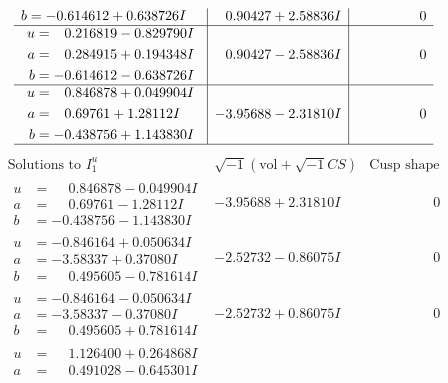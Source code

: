 \documentclass[1p]{elsarticle_modified}
\theoremstyle{definition}
\newcommand{\I}{\sqrt{-1}}
\begin{document}
$$\begin{array}{c|c|c}
\begin{aligned}
b &= -0.614612 + 0.638726 I\end{aligned}
 & \phantom{-}0.90427 + 2.58836 I & \phantom{-0.000000 } 0 \\ \hline\begin{aligned}
u &= \phantom{-}0.216819 - 0.829790 I \\
a &= \phantom{-}0.284915 + 0.194348 I \\
b &= -0.614612 - 0.638726 I\end{aligned}
 & \phantom{-}0.90427 - 2.58836 I & \phantom{-0.000000 } 0 \\ \hline\begin{aligned}
u &= \phantom{-}0.846878 + 0.049904 I \\
a &= \phantom{-}0.69761 + 1.28112 I \\
b &= -0.438756 + 1.143830 I\end{aligned}
 & -3.95688 - 2.31810 I & \phantom{-0.000000 } 0\\
 \hline 
 \end{array}$$\newpage$$\begin{array}{c|c|c}  
\text{Solutions to }I^u_{1}& \I (\text{vol} + \sqrt{-1}CS) & \text{Cusp shape}\\
 \hline 
\begin{aligned}
u &= \phantom{-}0.846878 - 0.049904 I \\
a &= \phantom{-}0.69761 - 1.28112 I \\
b &= -0.438756 - 1.143830 I\end{aligned}
 & -3.95688 + 2.31810 I & \phantom{-0.000000 } 0 \\ \hline\begin{aligned}
u &= -0.846164 + 0.050634 I \\
a &= -3.58337 + 0.37080 I \\
b &= \phantom{-}0.495605 - 0.781614 I\end{aligned}
 & -2.52732 - 0.86075 I & \phantom{-0.000000 } 0 \\ \hline\begin{aligned}
u &= -0.846164 - 0.050634 I \\
a &= -3.58337 - 0.37080 I \\
b &= \phantom{-}0.495605 + 0.781614 I\end{aligned}
 & -2.52732 + 0.86075 I & \phantom{-0.000000 } 0 \\ \hline\begin{aligned}
u &= \phantom{-}1.126400 + 0.264868 I \\
a &= \phantom{-}0.491028 - 0.645301 I \\

\end{aligned}
\end{array}$$
\end{document}
